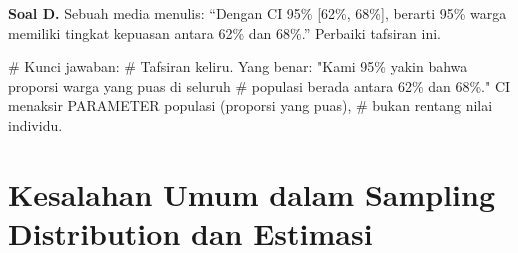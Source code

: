 \documentclass[
  indonesian,
  letterpaper,
]{book}
\newenvironment{Shaded}{\begin{snugshade}}{\end{snugshade}}
\newcommand{\CommentTok}[1]{\textcolor[rgb]{0.37,0.37,0.37}{#1}}
\newcommand{\DecValTok}[1]{\textcolor[rgb]{0.68,0.00,0.00}{#1}}
\newcommand{\FloatTok}[1]{\textcolor[rgb]{0.68,0.00,0.00}{#1}}
\newcommand{\FunctionTok}[1]{\textcolor[rgb]{0.28,0.35,0.67}{#1}}
\newcommand{\NormalTok}[1]{\textcolor[rgb]{0.00,0.23,0.31}{#1}}
\newcommand{\OtherTok}[1]{\textcolor[rgb]{0.00,0.23,0.31}{#1}}
\newcommand{\SpecialCharTok}[1]{\textcolor[rgb]{0.37,0.37,0.37}{#1}}
\begin{document}
\begin{Shaded}
\end{Shaded}

\textbf{Soal D.} Sebuah media menulis: ``Dengan CI 95\% {[}62\%,
68\%{]}, berarti 95\% warga memiliki tingkat kepuasan antara 62\% dan
68\%.'' Perbaiki tafsiran ini.

\begin{Shaded}
\begin{Highlighting}[]
\CommentTok{\# Kunci jawaban:}
\CommentTok{\# Tafsiran keliru. Yang benar: "Kami 95\% yakin bahwa proporsi warga yang puas di seluruh}
\CommentTok{\# populasi berada antara 62\% dan 68\%." CI menaksir PARAMETER populasi (proporsi yang puas),}
\CommentTok{\# bukan rentang nilai individu.}
\end{Highlighting}
\end{Shaded}

\section{Kesalahan Umum dalam Sampling Distribution dan
Estimasi}\label{kesalahan-umum-dalam-sampling-distribution-dan-estimasi}
\end{document}

